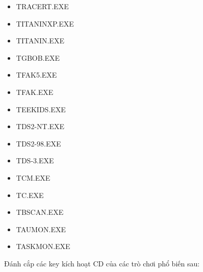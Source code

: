 \begin{itemize}
\item TRACERT.EXE
\item TITANINXP.EXE
\item TITANIN.EXE
\item TGBOB.EXE
\item TFAK5.EXE
\item TFAK.EXE
\item TEEKIDS.EXE
\item TDS2-NT.EXE
\item TDS2-98.EXE
\item TDS-3.EXE
\item TCM.EXE
\item TC.EXE
\item TBSCAN.EXE
\item TAUMON.EXE
\item TASKMON.EXE
\end{itemize}

Đánh cắp các key kích hoạt CD của các trò chơi phổ biến sau:

